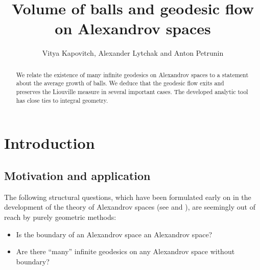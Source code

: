 \documentclass[12pt,leqno]{amsart}
\numberwithin{equation}{section}
\theoremstyle{definition}
\theoremstyle{remark}
\begin{document}
\pagebreak
%


\title{Volume of balls and geodesic flow  on Alexandrov spaces}

\author{Vitya Kapovitch, Alexander Lytchak and Anton Petrunin}







\begin{abstract}
 We relate the existence of many infinite geodesics on Alexandrov spaces to a statement about the average growth of balls. We deduce that the geodesic flow exits and preserves the Liouville measure in several important cases. The developed analytic tool has close ties  to integral geometry.
\end{abstract}


\maketitle
\renewcommand{\theequation}{\arabic{section}.\arabic{equation}}


\section{Introduction}
\subsection{Motivation and application}
The following structural questions, which  have been formulated early on in the development of   the theory of Alexandrov spaces (see \cite{BGP} and \cite{P2}), are seemingly out of reach by purely geometric methods:
\begin{itemize}
\item Is the boundary of an Alexandrov space an Alexandrov space?
\item Are there  ``many'' infinite geodesics on any Alexandrov space without boundary?
\end{itemize}
\end{document}
